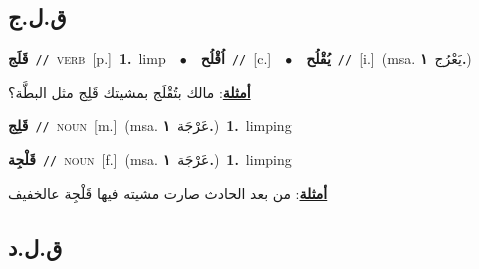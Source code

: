 \documentclass[10pt,a4paper,twoside]{article} %
\begin{document}
\begin{multicols}{2}
\vspace{-3mm}
\subsection*{\color{blue}\foreignlanguage{arabic}{ق.ل.ج}\color{blue}{}} 

{\setlength\topsep{0pt}\textbf{\foreignlanguage{arabic}{قَلَج}}\ {\color{gray}\texttt{//}\color{black}}\ \textsc{verb}\ [p.]\ \textbf{1.}~limp\ \ $\bullet$\ \ \setlength\topsep{0pt}\textbf{\foreignlanguage{arabic}{اُقْلُح}}\ {\color{gray}\texttt{//}\color{black}}\ [c.]\ \ $\bullet$\ \ \setlength\topsep{0pt}\textbf{\foreignlanguage{arabic}{يُقْلُح}}\ {\color{gray}\texttt{//}\color{black}}\ [i.]\ \color{gray}(msa. \foreignlanguage{arabic}{يَعْرُج}~\foreignlanguage{arabic}{\textbf{١.}})\color{black}\  \begin{flushright}\color{gray}\foreignlanguage{arabic}{\textbf{\underline{\foreignlanguage{arabic}{أمثلة}}}: مالك بتُقْلَج بمشيتك قَلِج مثل البطَّة؟}\end{flushright}\color{black}} \vspace{2mm}

{\setlength\topsep{0pt}\textbf{\foreignlanguage{arabic}{قَلِج}}\ {\color{gray}\texttt{//}\color{black}}\ \textsc{noun}\ [m.]\ \color{gray}(msa. \foreignlanguage{arabic}{عَرْجَة}~\foreignlanguage{arabic}{\textbf{١.}})\color{black}\ \textbf{1.}~limping\ } \vspace{2mm}

{\setlength\topsep{0pt}\textbf{\foreignlanguage{arabic}{قَلْجِة}}\ {\color{gray}\texttt{//}\color{black}}\ \textsc{noun}\ [f.]\ \color{gray}(msa. \foreignlanguage{arabic}{عَرْجَة}~\foreignlanguage{arabic}{\textbf{١.}})\color{black}\ \textbf{1.}~limping\  \begin{flushright}\color{gray}\foreignlanguage{arabic}{\textbf{\underline{\foreignlanguage{arabic}{أمثلة}}}: من بعد الحادث صارت مشيته فيها قَلْجِة عالخفيف}\end{flushright}\color{black}} \vspace{2mm}

\vspace{-3mm}
\subsection*{\color{blue}\foreignlanguage{arabic}{ق.ل.د}\color{blue}{}} 


\end{multicols}
\end{document}
